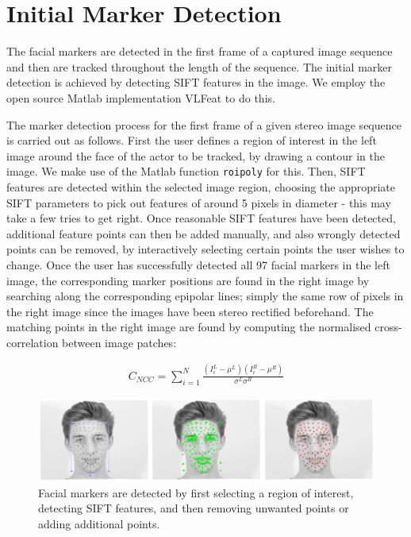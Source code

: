 \documentclass[11pt]{report}
\begin{document}
\section{Initial Marker Detection}

The facial markers are detected in the first frame of a captured image sequence and then are tracked throughout the length of the sequence. The initial marker detection is achieved by detecting SIFT features in the image. We employ the open source Matlab implementation VLFeat \cite{vedaldi08vlfeat} to do this. 

The marker detection process for the first frame of a given stereo image sequence is carried out as follows. First the user defines a region of interest in the left image around the face of the actor to be tracked, by drawing a contour in the image. We make use of the Matlab function \texttt{roipoly} for this. Then, SIFT features are detected within the selected image region, choosing the appropriate SIFT parameters to pick out features of around 5 pixels in diameter - this may take a few tries to get right. Once reasonable SIFT features have been detected, additional feature points can then be added manually, and also wrongly detected points can be removed, by interactively selecting certain points the user wishes to change. Once the user has successfully detected all 97 facial markers in the left image, the corresponding marker positions are found in the right image by searching along the corresponding epipolar lines; simply the same row of pixels in the right image since the images have been stereo rectified beforehand. The matching points in the right image are found by computing the normalised cross-correlation between image patches:

\begin{equation}
\begin{aligned}
	C_{NCC} = \sum_{i=1}^N \frac{(I_i^L - \mu^L)(I_i^R - \mu^R)}{\sigma^L \sigma^R}
\end{aligned}
\end{equation}

\begin{figure}[htbp!]
\centering
\includegraphics[width=\textwidth]{img/detection}
	\caption{Facial markers are detected by first selecting a region of interest, detecting SIFT features, and then removing unwanted points or adding additional points.}
	\label{fig:detection}
\end{figure}
\end{document}
